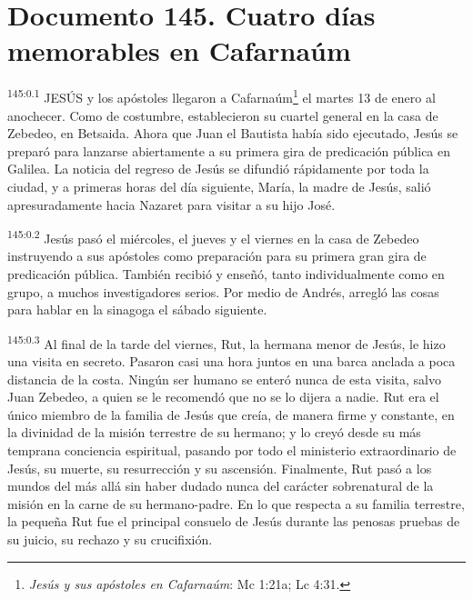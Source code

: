 \chapter{Documento 145. Cuatro días memorables en Cafarnaúm}
\par 
\textsuperscript{145:0.1} JESÚS y los apóstoles llegaron a Cafarnaúm\footnote{\textit{Jesús y sus apóstoles en Cafarnaúm}: Mc 1:21a; Lc 4:31.} el martes 13 de enero al anochecer. Como de costumbre, establecieron su cuartel general en la casa de Zebedeo, en Betsaida. Ahora que Juan el Bautista había sido ejecutado, Jesús se preparó para lanzarse abiertamente a su primera gira de predicación pública en Galilea. La noticia del regreso de Jesús se difundió rápidamente por toda la ciudad, y a primeras horas del día siguiente, María, la madre de Jesús, salió apresuradamente hacia Nazaret para visitar a su hijo José.

\par 
\textsuperscript{145:0.2} Jesús pasó el miércoles, el jueves y el viernes en la casa de Zebedeo instruyendo a sus apóstoles como preparación para su primera gran gira de predicación pública. También recibió y enseñó, tanto individualmente como en grupo, a muchos investigadores serios. Por medio de Andrés, arregló las cosas para hablar en la sinagoga el sábado siguiente.

\par 
\textsuperscript{145:0.3} Al final de la tarde del viernes, Rut, la hermana menor de Jesús, le hizo una visita en secreto. Pasaron casi una hora juntos en una barca anclada a poca distancia de la costa. Ningún ser humano se enteró nunca de esta visita, salvo Juan Zebedeo, a quien se le recomendó que no se lo dijera a nadie. Rut era el único miembro de la familia de Jesús que creía, de manera firme y constante, en la divinidad de la misión terrestre de su hermano; y lo creyó desde su más temprana conciencia espiritual, pasando por todo el ministerio extraordinario de Jesús, su muerte, su resurrección y su ascensión. Finalmente, Rut pasó a los mundos del más allá sin haber dudado nunca del carácter sobrenatural de la misión en la carne de su hermano-padre. En lo que respecta a su familia terrestre, la pequeña Rut fue el principal consuelo de Jesús durante las penosas pruebas de su juicio, su rechazo y su crucifixión.

